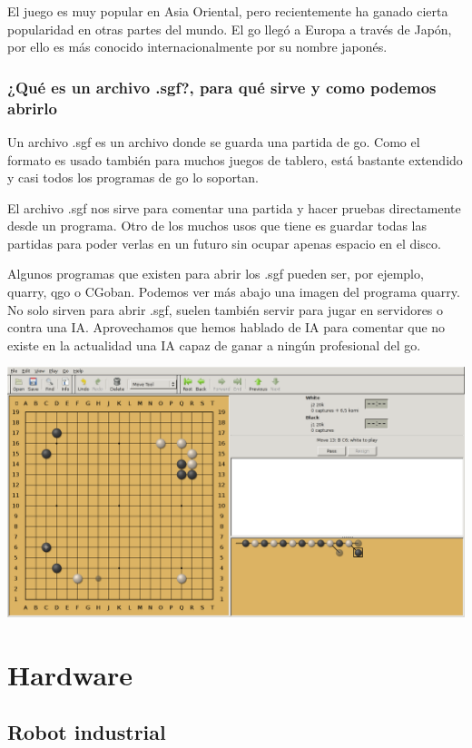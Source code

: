 \documentclass[12pt,a4papert,woside,openright,titlepage,final]{book}
\begin{document}
El juego es muy popular en Asia Oriental, pero recientemente ha ganado cierta
popularidad en otras partes del mundo. El go llegó a Europa a través de Japón,
por ello es más conocido internacionalmente por su nombre japonés.


\subsection{¿Qué es un archivo .sgf?, para qué sirve y como podemos abrirlo}

\label{sgf} Un archivo .sgf es un archivo donde se guarda una partida de
go. Como el formato es usado también para muchos juegos de tablero, está
bastante extendido y casi todos los programas de go lo soportan.

El archivo .sgf nos sirve para comentar una partida y hacer pruebas directamente
desde un programa. Otro de los muchos
usos que tiene es guardar todas las partidas para poder verlas en un futuro sin
ocupar apenas espacio en el disco. 

Algunos programas que existen para abrir los .sgf pueden ser, por ejemplo,
quarry, qgo o CGoban. Podemos ver más abajo una imagen del programa quarry. No
solo sirven para abrir .sgf, suelen también servir para jugar en servidores o
contra una IA. Aprovechamos que hemos hablado de IA para comentar que no existe
en la actualidad una IA capaz de ganar a ningún profesional del go.

\includegraphics[scale=0.33]{quarry.png}

\chapter{Hardware}

\section{Robot industrial}
\end{document}
